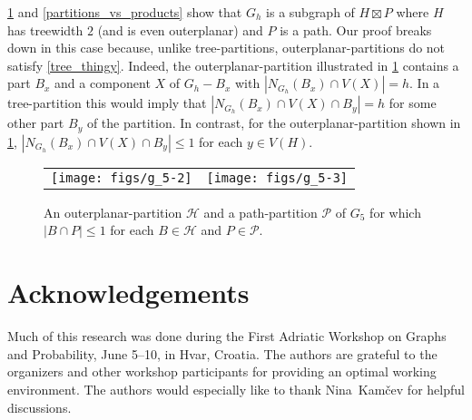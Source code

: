 \documentclass{patmorin}
\renewcommand{\le}{\leqslant}
\begin{document}
\cref{two_tree} and \cref{partitions_vs_products} show that $G_h$ is a subgraph of $H\boxtimes P$ where $H$ has treewidth $2$ (and is even outerplanar) and $P$ is a path. Our proof breaks down in this case because, unlike tree-partitions, outerplanar-partitions do not satisfy \cref{tree_thingy}.  Indeed, the outerplanar-partition illustrated in \cref{two_tree} contains a part $B_x$ and a component $X$ of $G_h-B_x$ with $|N_{G_h}(B_x)\cap V(X)|=h$.  In a tree-partition this would imply that $|N_{G_h}(B_x)\cap V(X)\cap B_y|=h$ for some other part $B_y$ of the partition.  In contrast, for the outerplanar-partition shown in \cref{two_tree}, $|N_{G_h}(B_x)\cap V(X)\cap B_y|\le 1$ for each $y\in V(H)$.


\begin{figure}
  \begin{center}
    \begin{tabular}{cc}
      \texttt{[image: figs/g\_5-2]} & \texttt{[image: figs/g\_5-3]}
    \end{tabular}
  \end{center}
  \caption{An outerplanar-partition $\mathcal{H}$ and a path-partition $\mathcal{P}$ of $G_5$ for which $|B\cap P|\le 1$ for each $B\in\mathcal{H}$ and $P\in\mathcal{P}$.}
  \label{two_tree}
\end{figure}

\section*{Acknowledgements}

Much of this research was done during the First Adriatic Workshop on Graphs and Probability, June 5--10, in Hvar, Croatia.  The authors are grateful to the organizers and other workshop participants for providing an optimal working environment.  The authors would especially like to thank Nina~Kamčev for helpful discussions.





\end{document}
